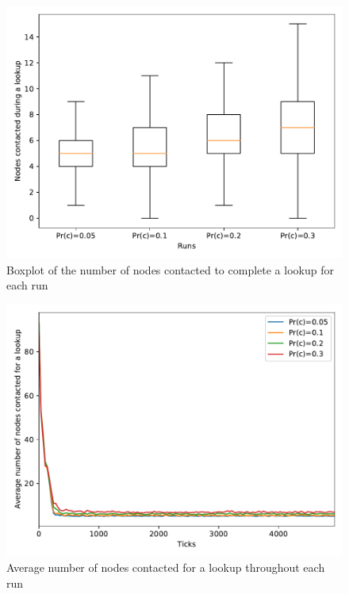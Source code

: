 \documentclass[11pt,twocolumn,letterpaper]{article}
\begin{document}
		\begin{figure}[!h]
			\centering
			\includegraphics[width=\linewidth,clip,trim=0 0.5cm 0 0.35cm]{figures/analysis1/nodescontacted_box.pdf}
			\caption{Boxplot of the number of nodes contacted to complete a lookup for each run}
			\label{fig:crash3}
		\end{figure}
		\begin{figure}[!h]
			\centering
			\includegraphics[width=\linewidth,clip,trim=0 0.5cm 0 0.35cm]{figures/analysis1/nodescontacted_time.pdf}
			\caption{Average number of nodes contacted for a lookup throughout each run}
			\label{fig:crash4}
		\end{figure}
\end{document}

